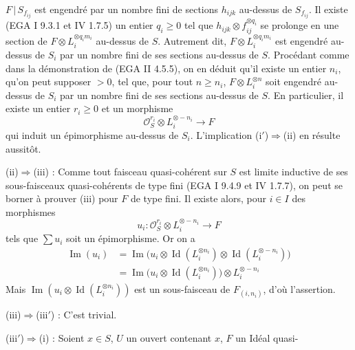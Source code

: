 $F\,|\,S_{f_{ij}}$ est
engendré par un nombre fini de sections $h_{ijk}$ au-dessus de $S_{f_{ij}}$. Il existe (EGA I 9.3.1 et IV 1.7.5) un entier $q_i\ge0$ tel que $h_{ijk}\otimes f_{ij}^{\otimes q_i}$ se prolonge en une section de $F\otimes L_i^{\otimes q_im_i}$ au-dessus de $S$. Autrement dit, $F\otimes L_i^{\otimes q_im_i}$ est engendré au-dessus de $S_i$ par un nombre fini de ses sections au-dessus de $S$. Procédant comme dans la démonstration de (EGA II 4.5.5), on en déduit qu'il existe un entier $n_i$, qu'on peut supposer $>0$, tel que, pour tout $n\ge n_i$, $F\otimes L_i^{\otimes n}$ soit engendré au-dessus de $S_i$ par un nombre fini de ses sections au-dessus de $S$. En particulier, il existe un entier $r_i\ge0$ et un morphisme
\[
\mathcal O_S^{r_i}\otimes L_i^{\otimes-n_i}\longrightarrow F
\]
qui induit un épimorphisme au-dessus de $S_i$. L'implication (i$'$)$\Rightarrow$(ii) en résulte aussitôt.

(ii)$\Rightarrow$(iii) : Comme tout faisceau quasi-cohérent sur $S$ est limite inductive de ses sous-faisceaux quasi-cohérents de type fini (EGA I 9.4.9 et IV 1.7.7), on peut se borner à prouver (iii) pour $F$ de type fini. Il existe alors, pour $i\in I$ des morphismes
\[
u_i:\mathcal O_S^{r_i}\otimes L_i^{\otimes-n_i}\longrightarrow F
\]
tels que $\sum u_i$ soit un épimorphisme. Or on a
\[
\begin{aligned}
\operatorname{Im}(u_i)&=\operatorname{Im}\bigl(u_i\otimes\operatorname{Id}(L_i^{\otimes n_i})\otimes\operatorname{Id}(L_i^{\otimes-n_i})\bigr)\\
&=\operatorname{Im}\bigl(u_i\otimes\operatorname{Id}(L_i^{\otimes n_i})\bigr)\otimes L_i^{\otimes-n_i}
\end{aligned}
\]
Mais $\operatorname{Im}(u_i\otimes\operatorname{Id}(L_i^{\otimes n_i}))$ est un sous-faisceau de $F_{(i,n_i)}$, d'où l'assertion.

(iii)$\Rightarrow$(iii$'$) : C'est trivial.

(iii$'$)$\Rightarrow$(i) : Soient $x\in S$, $U$ un ouvert contenant $x$, $F$ un Idéal 
quasi-%

